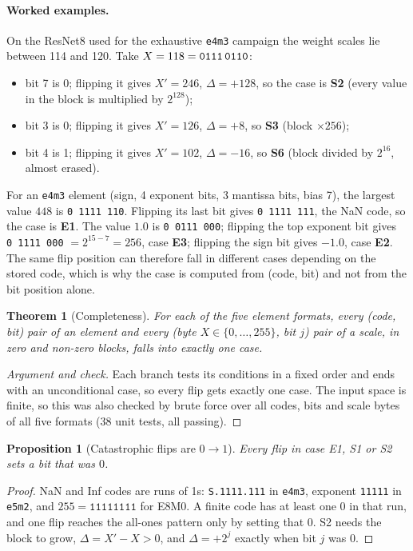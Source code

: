 \documentclass[12pt,a4paper]{article}
\newcommand{\fmt}[1]{\texttt{#1}}
\newtheorem{theorem}{Theorem}
\newtheorem{proposition}{Proposition}
\begin{document}
\paragraph{Worked examples.} On the ResNet8 used for the exhaustive \fmt{e4m3} campaign the
weight scales lie between 114 and 120. Take $X = 118 = \texttt{0111\,0110}$:
\begin{itemize}
    \item bit 7 is 0; flipping it gives $X' = 246$, $\Delta = +128$, so the case is
          \textbf{S2} (every value in the block is multiplied by $2^{128}$);
    \item bit 3 is 0; flipping it gives $X' = 126$, $\Delta = +8$, so \textbf{S3} (block
          $\times256$);
    \item bit 4 is 1; flipping it gives $X' = 102$, $\Delta = -16$, so \textbf{S6} (block
          divided by $2^{16}$, almost erased).
\end{itemize}
For an \fmt{e4m3} element (sign, 4 exponent bits, 3 mantissa bits, bias 7), the largest value
$448$ is \texttt{0\,1111\,110}. Flipping its last bit gives \texttt{0\,1111\,111}, the NaN code,
so the case is \textbf{E1}. The value $1.0$ is \texttt{0\,0111\,000}; flipping the top exponent
bit gives \texttt{0\,1111\,000} $=2^{15-7}=256$, case \textbf{E3}; flipping the sign bit gives
$-1.0$, case \textbf{E2}. The same flip position can therefore fall in different cases
depending on the stored code, which is why the case is computed from (code, bit) and not from
the bit position alone.

\begin{theorem}[Completeness]
For each of the five element formats, every (code, bit) pair of an element and every
(byte $X\in\{0,\dots,255\}$, bit $j$) pair of a scale, in zero and non-zero blocks, falls into
exactly one case.
\end{theorem}
\begin{proof}[Argument and check]
Each branch tests its conditions in a fixed order and ends with an unconditional case, so
every flip gets exactly one case. The input space is finite, so this was also checked by brute
force over all codes, bits and scale bytes of all five formats (38 unit tests, all passing).
\end{proof}

\begin{proposition}[Catastrophic flips are $0\to1$]
Every flip in case E1, S1 or S2 sets a bit that was $0$.
\end{proposition}
\begin{proof}
NaN and Inf codes are runs of 1s: \texttt{S.1111.111} in \fmt{e4m3}, exponent \texttt{11111}
in \fmt{e5m2}, and $255=\texttt{11111111}$ for E8M0. A finite code has at least one 0 in that
run, and one flip reaches the all-ones pattern only by setting that 0. S2 needs the block to
grow, $\Delta = X'-X > 0$, and $\Delta = +2^j$ exactly when bit $j$ was 0.
\end{proof}
\end{document}
